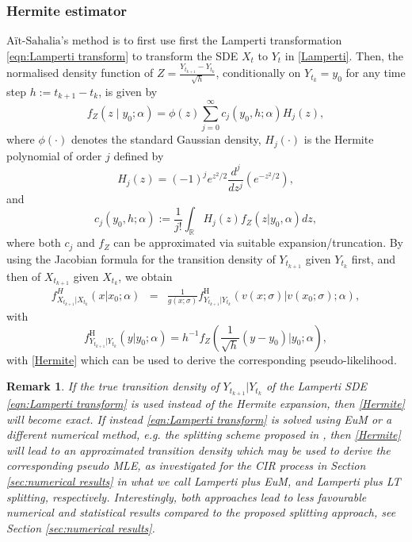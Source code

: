 \documentclass[a4paper,12pt]{article}
\numberwithin{equation}{section}
\theoremstyle{plain}
\newtheorem{remark}{Remark}
\theoremstyle{definition}
\begin{document}
\subsubsection{Hermite estimator}\label{SecHermite} 
 $\text{Aït-Sahalia}$'s method \cite{ait-sahalia_maximum_2002}
 is to first use first the Lamperti transformation \eqref{eqn:Lamperti transform} to transform the SDE $X_t$ to $Y_t$ in \eqref{Lamperti}. Then, the normalised density function of $Z=\frac{Y_{t_{k+1}}-Y_{t_k}}{\sqrt{h}}$, conditionally on $Y_{t_k}=y_0$ for any time step $h:=t_{k+1}-t_{k}$,  is given by
\begin{equation*}
    f_{Z}(z\mid y_0;\alpha )=\phi(z)\sum_{j=0}^\infty c_j(y_0,h;\alpha)H_j(z),
\end{equation*}
where $\phi(\cdot)$ denotes the standard Gaussian density, $H_j(\cdot)$ is the Hermite polynomial of order $j$ defined by
\begin{equation*}
    H_j(z)=(-1)^j e^{z^2 / 2} \frac{d^j}{d z^j}\left(e^{-z^2 / 2}\right),
\end{equation*}
and  
\begin{equation*}
   c_j\left(y_0,h;
\alpha\right):=\frac{1}{j!}\int_\mathbb{R} H_j(z)f_{Z}(z|y_0,\alpha)dz,
\end{equation*}
where both $c_j$ and $f_Z$ can be approximated via suitable expansion/truncation. By using the Jacobian formula for the transition density of $Y_{t_{k+1}}$ given $Y_{t_k}$ first, and then of $X_{t_{k+1}}$ given $X_{t_k}$, we obtain
\begin{eqnarray}
\label{Hermite}
f^H_{X_{t_{k+1}}|X_{t_k}}(x|x_0;\alpha)&=&\frac{1}{g(x;\sigma)}f^{\textrm{H}}_{Y_{t_{k+1}}|Y_{t_k}}(v(x;\sigma)|v(x_0;\sigma);\alpha),
\end{eqnarray}
with 
\[
f^{\textrm{H}}_{Y_{t_{k+1}}|Y_{t_k}}(y|y_0;\alpha)=h^{-1}f_Z\left(\frac{1}{\sqrt{h}}(y-y_0)|y_0;\alpha\right),
\]
with \eqref{Hermite} which can be used to derive the corresponding pseudo-likelihood.
\begin{remark}\label{remarkLamperti}
If the true transition density of $Y_{t_{k+1}}|Y_{t_k}$ of the Lamperti SDE \eqref{eqn:Lamperti transform} is used instead of the Hermite expansion, then \eqref{Hermite} will become exact. If instead 
\eqref{eqn:Lamperti transform} is solved using EuM or a different numerical method, e.g. the splitting scheme  proposed in \cite{kelly_adaptive_2023}, then \eqref{Hermite} will lead to an approximated transition density which may be used to derive the corresponding pseudo MLE, as investigated  for the CIR process in Section \ref{sec:numerical results} in what we call \textit{Lamperti plus EuM}, and \textit{Lamperti plus LT splitting}, respectively. Interestingly, both approaches lead to less favourable numerical and statistical results compared to the proposed splitting approach, see  Section \ref{sec:numerical results}.
\end{remark}
\end{document}
